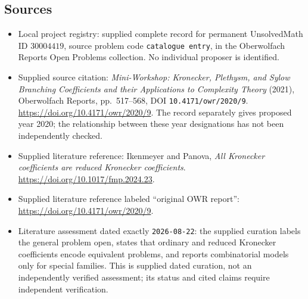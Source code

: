 \documentclass[11pt]{article}
\begin{document}
\subsection{Sources}
\begin{itemize}
\item Local project registry: supplied complete record for permanent UnsolvedMath ID \(30004419\), source problem code \texttt{catalogue entry}, in the Oberwolfach Reports Open Problems collection. No individual proposer is identified.
\item Supplied source citation: \emph{Mini-Workshop: Kronecker, Plethysm, and Sylow Branching Coefficients and their Applications to Complexity Theory} (2021), Oberwolfach Reports, pp.\ 517--568, DOI \texttt{10.4171/owr/2020/9}. \url{https://doi.org/10.4171/owr/2020/9}. The record separately gives proposed year 2020; the relationship between these year designations has not been independently checked.
\item Supplied literature reference: Ikenmeyer and Panova, \emph{All Kronecker coefficients are reduced Kronecker coefficients}. \url{https://doi.org/10.1017/fmp.2024.23}.
\item Supplied literature reference labeled ``original OWR report'': \url{https://doi.org/10.4171/owr/2020/9}.
\item Literature assessment dated exactly \texttt{2026-08-22}: the supplied curation labels the general problem open, states that ordinary and reduced Kronecker coefficients encode equivalent problems, and reports combinatorial models only for special families. This is supplied dated curation, not an independently verified assessment; its status and cited claims require independent verification.
\end{itemize}
\end{document}
